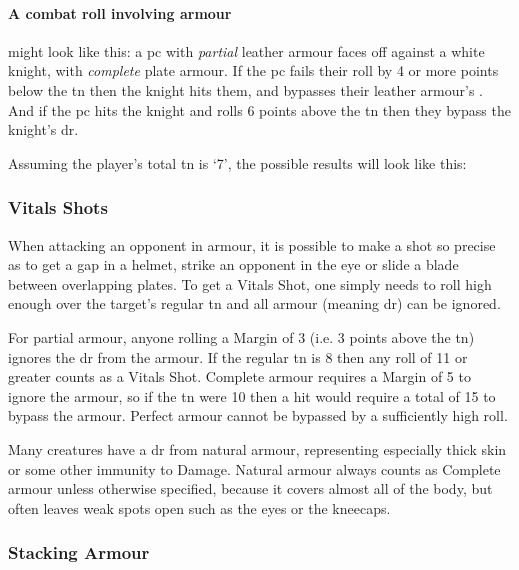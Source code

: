 \begin{multicols}{2}
{  \paragraph{A combat roll involving armour}
  might look like this: a \gls{pc} with \textit{partial} leather armour faces off against a white knight, with \textit{complete} plate armour.
  If the \gls{pc} fails their roll by 4 or more points below the \gls{tn} then the knight hits them, and bypasses their leather armour's .
  And if the \gls{pc} hits the knight and rolls 6 points above the \gls{tn} then they bypass the knight's \gls{dr}.

  Assuming the player's total \gls{tn} is `7', the possible results will look like this:

}{
}

\subsubsection{Vitals Shots}
\label{vitals}

When attacking an opponent in armour, it is possible to make a shot so precise as to get a gap in a helmet, strike an opponent in the eye or slide a blade between overlapping plates.
To get a Vitals Shot, one simply needs to roll high enough over the target's regular \gls{tn} and all armour (meaning \gls{dr}) can be ignored.

For partial armour, anyone rolling a Margin of 3 (i.e.
3 points above the \gls{tn}) ignores the \gls{dr} from the armour.
If the regular \gls{tn} is 8 then any roll of 11 or greater counts as a Vitals Shot.
Complete armour requires a Margin of 5 to ignore the armour, so if the \gls{tn} were 10 then a hit would require a total of 15 to bypass the armour.
Perfect armour cannot be bypassed by a sufficiently high roll.

Many creatures have a \gls{dr} from natural armour, representing especially thick skin or some other immunity to Damage.
Natural armour always counts as Complete armour unless otherwise specified, because it covers almost all of the body, but often leaves weak spots open such as the eyes or the kneecaps.


\begin{figure*}[t!]
\projectilesChart
\end{figure*}

\subsubsection{Stacking Armour}
\label{stackingarmour}


\end{multicols}
